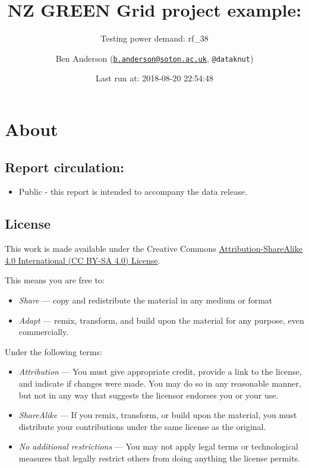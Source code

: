 \documentclass[]{article}
\title{NZ GREEN Grid project example:}
\subtitle{Testing power demand: rf\_38}
\author{Ben Anderson
(\href{mailto:b.anderson@soton.ac.uk}{\nolinkurl{b.anderson@soton.ac.uk}},
\texttt{@dataknut})}
\date{Last run at: 2018-08-20 22:54:48}
\providecommand{\tightlist}{%
  \setlength{\itemsep}{0pt}\setlength{\parskip}{0pt}}
\theoremstyle{definition}
\theoremstyle{definition}
\theoremstyle{definition}
\theoremstyle{remark}
\begin{document}
\maketitle

{
\setcounter{tocdepth}{2}
\tableofcontents
}
\newpage

\section{About}\label{about}

\subsection{Report circulation:}\label{report-circulation}

\begin{itemize}
\tightlist
\item
  Public - this report is intended to accompany the data release.
\end{itemize}

\subsection{License}\label{license}

This work is made available under the Creative Commons
\href{https://creativecommons.org/licenses/by-sa/4.0/}{Attribution-ShareAlike
4.0 International (CC BY-SA 4.0) License}.

This means you are free to:

\begin{itemize}
\tightlist
\item
  \emph{Share} --- copy and redistribute the material in any medium or
  format
\item
  \emph{Adapt} --- remix, transform, and build upon the material for any
  purpose, even commercially.
\end{itemize}

Under the following terms:

\begin{itemize}
\tightlist
\item
  \emph{Attribution} --- You must give appropriate credit, provide a
  link to the license, and indicate if changes were made. You may do so
  in any reasonable manner, but not in any way that suggests the
  licensor endorses you or your use.
\item
  \emph{ShareAlike} --- If you remix, transform, or build upon the
  material, you must distribute your contributions under the same
  license as the original.
\item
  \emph{No additional restrictions} --- You may not apply legal terms or
  technological measures that legally restrict others from doing
  anything the license permits.
\end{itemize}
\end{document}
